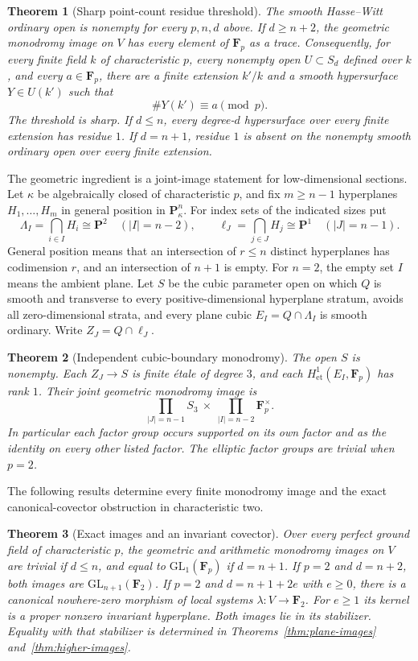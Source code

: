 \documentclass[11pt]{article}
\newtheorem{theorem}{Theorem}[section]
\begin{document}
\begin{theorem}[Sharp point-count residue threshold]\label{thm:threshold}
The smooth Hasse--Witt ordinary open is nonempty for every $p,n,d$ above. If $d\ge n+2$, the geometric monodromy image on $V$ has every element of $\mathbf F_p$ as a trace. Consequently, for every finite field $k$ of characteristic $p$, every nonempty open $U\subset S_d$ defined over $k$, and every $a\in\mathbf F_p$, there are a finite extension $k'/k$ and a smooth hypersurface $Y\in U(k')$ such that
\[
\#Y(k')\equiv a\pmod p.
\]
The threshold is sharp. If $d\le n$, every degree-$d$ hypersurface over every finite extension has residue $1$. If $d=n+1$, residue $1$ is absent on the nonempty smooth ordinary open over every finite extension.
\end{theorem}

The geometric ingredient is a joint-image statement for low-dimensional sections. Let $\kappa$ be algebraically closed of characteristic $p$, and fix $m\ge n-1$ hyperplanes $H_1,\ldots,H_m$ in general position in $\mathbf P^n_\kappa$. For index sets of the indicated sizes put
\[
\Lambda_I=\bigcap_{i\in I}H_i\cong\mathbf P^2\quad(|I|=n-2),
\qquad
\ell_J=\bigcap_{j\in J}H_j\cong\mathbf P^1\quad(|J|=n-1).
\]
General position means that an intersection of $r\le n$ distinct hyperplanes has codimension $r$, and an intersection of $n+1$ is empty. For $n=2$, the empty set $I$ means the ambient plane. Let $S$ be the cubic parameter open on which $Q$ is smooth and transverse to every positive-dimensional hyperplane stratum, avoids all zero-dimensional strata, and every plane cubic $E_I=Q\cap\Lambda_I$ is smooth ordinary. Write $Z_J=Q\cap\ell_J$.

\begin{theorem}[Independent cubic-boundary monodromy]\label{thm:joint}
The open $S$ is nonempty. Each $Z_J\to S$ is finite \'etale of degree $3$, and each $H^1_{\mathrm{et}}(E_I,\mathbf F_p)$ has rank $1$. Their joint geometric monodromy image is
\[
\prod_{|J|=n-1}S_3\ \times\
\prod_{|I|=n-2}\mathbf F_p^\times.
\]
In particular each factor group occurs supported on its own factor and as the identity on every other listed factor. The elliptic factor groups are trivial when $p=2$.
\end{theorem}

The following results determine every finite monodromy image and the exact canonical-covector obstruction in characteristic two.

\begin{theorem}[Exact images and an invariant covector]\label{thm:images}
Over every perfect ground field of characteristic $p$, the geometric and arithmetic monodromy images on $V$ are trivial if $d\le n$, and equal to $\mathrm{GL}_1(\mathbf F_p)$ if $d=n+1$. If $p=2$ and $d=n+2$, both images are $\mathrm{GL}_{n+1}(\mathbf F_2)$. If $p=2$ and $d=n+1+2e$ with $e\ge0$, there is a canonical nowhere-zero morphism of local systems $\lambda:V\to\mathbf F_2$. For $e\ge1$ its kernel is a proper nonzero invariant hyperplane. Both images lie in its stabilizer. Equality with that stabilizer is determined in Theorems~\ref{thm:plane-images} and~\ref{thm:higher-images}.
\end{theorem}
\end{document}
